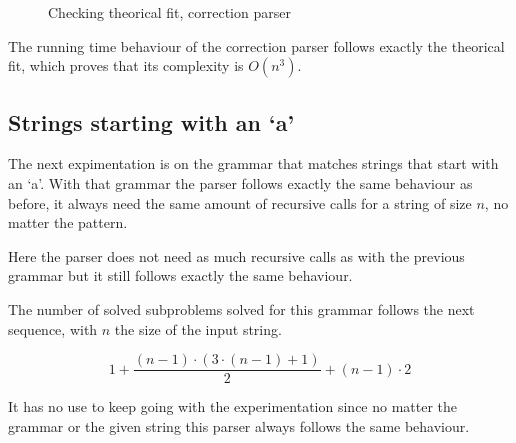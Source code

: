 \FloatBarrier
\begin{figure}[h]
\centering
{}
\caption{Checking theorical fit, correction parser}
\end{figure}
\FloatBarrier

The running time behaviour of the correction parser follows exactly the theorical fit, which proves that its complexity is $O(n^3)$.

\subsection{Strings starting with an `a'}

The next expimentation is on the grammar that matches strings that start with an `a'.
With that grammar the parser follows exactly the same behaviour as before, it always need the same amount of recursive calls for a string of size $n$, no matter the pattern.

\FloatBarrier
\begin{figure}[h]
\end{figure}
\FloatBarrier

Here the parser does not need as much recursive calls as with the previous grammar but it still follows exactly the same behaviour.

The number of solved subproblems solved for this grammar follows the next sequence, with $n$ the size of the input string.

$$
1 + \dfrac{(n - 1) \cdot (3 \cdot (n - 1) + 1)}{2} + (n - 1) \cdot 2
$$

It has no use to keep going with the experimentation since no matter the grammar or the given string this parser always follows the same behaviour.
